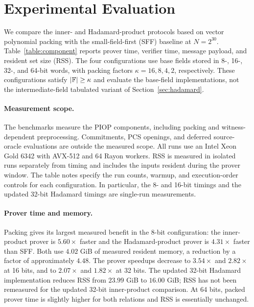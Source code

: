 \section{Experimental Evaluation}
\label{sec:experiment}

We compare the inner- and Hadamard-product protocols based on
vector polynomial packing with the small-field-first (SFF)
baseline at \(N=2^{30}\).
Table~\ref{table:component} reports prover time, verifier time,
message payload, and resident set size (RSS).
The four configurations use base fields stored in 8-, 16-, 32-,
and 64-bit words, with packing factors \(\kappa=16,8,4,2\),
respectively.
These configurations satisfy \(|{\mathbb{F}}|\geq\kappa\) and evaluate
the base-field implementations, not the intermediate-field
tabulated variant of Section~\ref{sec:hadamard}.

\paragraph{Measurement scope.}
The benchmarks measure the PIOP components, including packing and
witness-dependent preprocessing. Commitments, PCS openings, and
deferred source-oracle evaluations are outside the measured scope.
All runs use an Intel Xeon Gold 6342 with AVX-512 and 64 Rayon
workers. RSS is measured in isolated runs separately from timing
and includes the inputs resident during the prover window.
The table notes specify the run counts, warmup, and execution-order
controls for each configuration. In particular, the 8- and 16-bit
timings and the updated 32-bit Hadamard timings are single-run
measurements.

\paragraph{Prover time and memory.}
Packing gives its largest measured benefit in the 8-bit
configuration: the inner-product prover is \(5.60\times\) faster
and the Hadamard-product prover is \(4.31\times\) faster than SFF.
Both use \(4.02\) GiB of measured resident memory, a reduction by a
factor of approximately \(4.48\).
The prover speedups decrease to \(3.54\times\) and \(2.82\times\)
at 16 bits, and to \(2.07\times\) and \(1.82\times\) at 32 bits.
The updated 32-bit Hadamard implementation reduces RSS from
\(23.99\) GiB to \(16.00\) GiB; RSS has not been remeasured for
the updated 32-bit inner-product comparison.
At 64 bits, packed prover time is slightly higher for both relations
and RSS is essentially unchanged.


